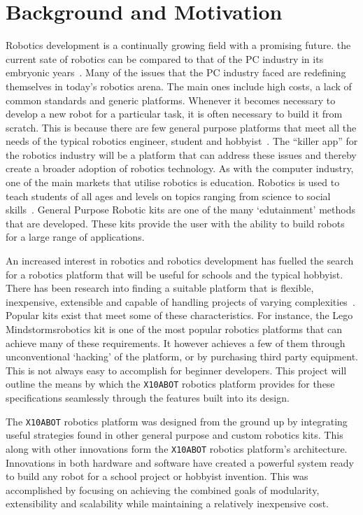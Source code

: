 \chapter{Background and Motivation} %
\label{cha:background_and_motivation}

Robotics development is a continually growing field with a promising future. the
current sate of robotics can be compared to that of the PC industry in its
embryonic years~\parencite{billgates}. Many of the issues that the PC industry faced are redefining
themselves in today's robotics arena. The main ones include high costs, a lack
of common standards and generic platforms. Whenever it becomes necessary to
develop a new robot for a particular task, it is often necessary to build
it from scratch. This is because there are few general purpose platforms that meet
all the needs of the typical robotics engineer, student and hobbyist~\parencite{r2p}. The
``killer app'' for the robotics industry will be a platform that can address these issues
and thereby create a broader adoption of robotics technology. As with the
computer industry, one of the main markets that utilise robotics is education.
Robotics is used to teach students of all ages and levels on topics ranging from
science to social skills~\parencite{kramer}. General Purpose Robotic kits are one of the many
`edutainment' methods that are developed. These kits provide the user with the
ability to build robots for a large range of applications.

An increased interest in robotics and robotics development has fuelled 
the search for a robotics platform that will be useful for schools and the 
typical hobbyist. There has been research into finding a suitable
platform that is flexible, inexpensive, extensible and capable of handling
projects of varying complexities~\parencite{bot-mate}. Popular kits exist that meet some of
these characteristics. For instance, the Lego Mindstorms\texttrademark  robotics
kit is one of the most popular robotics platforms that can achieve many of these
requirements. It however achieves a few of them through unconventional
`hacking' of the platform, or by purchasing third party equipment. This is not
always easy to accomplish for beginner developers. This project will outline
the means by which the \texttt{X10ABOT} robotics platform provides for these
specifications seamlessly through the features built into its design.

The \texttt{X10ABOT} robotics platform  was designed from the ground up by integrating useful strategies
found in other general purpose and custom robotics kits. This along
with other innovations form the \texttt{X10ABOT} robotics platform's
architecture. Innovations in both hardware and software have created a powerful 
system ready to build any robot for a school project or hobbyist invention.
This was accomplished by focusing on achieving the combined goals of modularity, 
extensibility and scalability while maintaining a relatively inexpensive cost.

